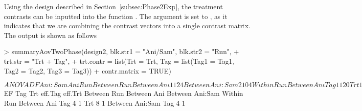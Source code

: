 \documentclass[article]{jss}
\begin{document}
Using the design described in Section~\ref{subsec:Phase2Exp}, the treatment contrasts can be inputted into the function . The argument  is set to , as it indicates that we are combining the contrast vectors into a single contrast matrix. The output is shown as follows
\begin{CodeChunk}
\begin{CodeInput}
> summaryAovTwoPhase(design2, blk.str1 = "Ani/Sam", blk.str2 = "Run", 
+ trt.str = "Trt + Tag", 
+ trt.contr = list(Trt = Trt, Tag = list(Tag1 = Tag1, Tag2 = Tag2, Tag3 = Tag3)) 
+ contr.matrix = TRUE)                               
\end{CodeInput}
\begin{CodeOutput}
$ANOVA
                   DF Ani:Sam Ani Run
Between Run                          
   Between Ani     1  1       2   4  
   Between Ani:Sam 2  1       0   4  
Within Run                              
   Between Ani                       
      Tag          1  1       2   0  
      Trt          1  1       2   0  
      Residual     4  1       2   0  
   Between Ani:Sam                   
      Tag          2  1       0   0  
      Residual     4  1       0   0  

$EF
                   Tag Trt eff.Tag eff.Trt
Between Run                               
   Between Ani                            
   Between Ani:Sam                        
Within Run                                   
   Between Ani                            
      Tag          4       1              
      Trt              8           1      
   Between Ani:Sam                        
      Tag          4       1              
\end{CodeOutput}
\end{CodeChunk}
\end{document}
